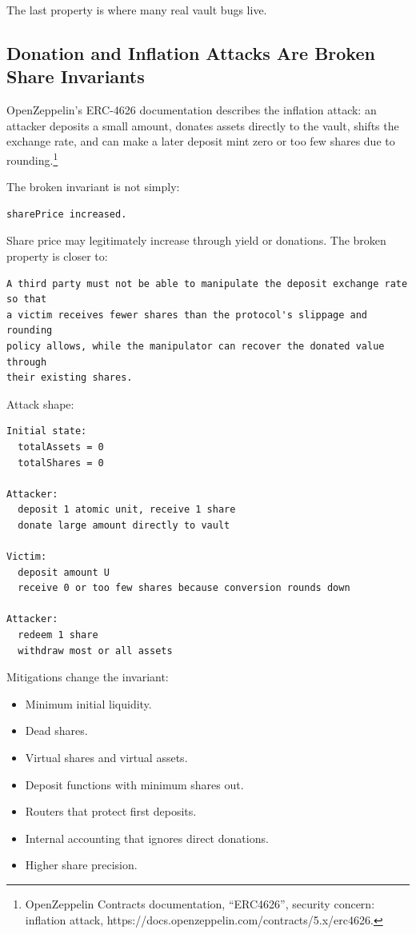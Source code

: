 The last property is where many real vault bugs live.

\subsection{Donation and Inflation Attacks Are Broken Share Invariants}

OpenZeppelin's ERC-4626 documentation describes the inflation attack: an
attacker deposits a small amount, donates assets directly to the vault,
shifts the exchange rate, and can make a later deposit mint zero or too
few shares due to rounding.\footnote{OpenZeppelin Contracts
  documentation, ``ERC4626'', security concern: inflation attack,
  https://docs.openzeppelin.com/contracts/5.x/erc4626.}

The broken invariant is not simply:

\begin{lstlisting}
sharePrice increased.
\end{lstlisting}

Share price may legitimately increase through yield or donations. The
broken property is closer to:

\begin{lstlisting}
A third party must not be able to manipulate the deposit exchange rate so that
a victim receives fewer shares than the protocol's slippage and rounding
policy allows, while the manipulator can recover the donated value through
their existing shares.
\end{lstlisting}

Attack shape:

\begin{lstlisting}
Initial state:
  totalAssets = 0
  totalShares = 0

Attacker:
  deposit 1 atomic unit, receive 1 share
  donate large amount directly to vault

Victim:
  deposit amount U
  receive 0 or too few shares because conversion rounds down

Attacker:
  redeem 1 share
  withdraw most or all assets
\end{lstlisting}

Mitigations change the invariant:

\begin{itemize}
\tightlist
\item
  Minimum initial liquidity.
\item
  Dead shares.
\item
  Virtual shares and virtual assets.
\item
  Deposit functions with minimum shares out.
\item
  Routers that protect first deposits.
\item
  Internal accounting that ignores direct donations.
\item
  Higher share precision.
\end{itemize}

